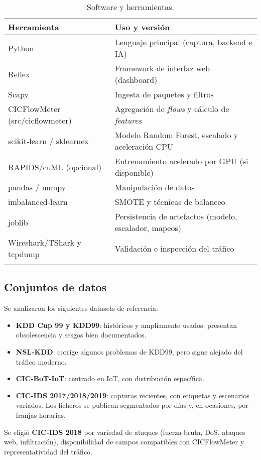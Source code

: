 \begin{longtable}{p{4cm}p{10cm}}
\textbf{Herramienta} & \textbf{Uso y versión} \\
\hline
Python & Lenguaje principal (captura, backend e IA) \\
Reflex & Framework de interfaz web (dashboard) \\
Scapy & Ingesta de paquetes y filtros \\
CICFlowMeter (src/cicflowmeter) & Agregación de \textit{flows} y cálculo de \textit{features} \\
scikit‑learn / sklearnex & Modelo Random Forest, escalado y aceleración CPU \\
RAPIDS/cuML (opcional) & Entrenamiento acelerado por GPU (si disponible) \\
pandas / numpy & Manipulación de datos \\
imbalanced‑learn & SMOTE y técnicas de balanceo \\
joblib & Persistencia de artefactos (modelo, escalador, mapeos) \\
Wireshark/TShark y tcpdump & Validación e inspección del tráfico \\
\hline
\caption{Software y herramientas.}\label{tab:sf-h}\\
\end{longtable}

\subsection{Conjuntos de datos}
Se analizaron los siguientes datasets de referencia:
\begin{itemize}
  \item \textbf{KDD Cup 99 y KDD99}: históricos y ampliamente usados; presentan obsolescencia y sesgos bien documentados.
  \item \textbf{NSL‑KDD}: corrige algunos problemas de KDD99, pero sigue alejado del tráfico moderno.
  \item \textbf{CIC‑BoT‑IoT}: centrado en IoT, con distribución específica.
  \item \textbf{CIC‑IDS 2017/2018/2019}: capturas recientes, con etiquetas y escenarios variados. Los ficheros se publican segmentados por días y, en ocasiones, por franjas horarias.
\end{itemize}

Se eligió \textbf{CIC‑IDS 2018} por variedad de ataques (fuerza bruta, DoS, ataques web, infiltración), disponibilidad de campos compatibles con CICFlowMeter y representatividad del tráfico.

